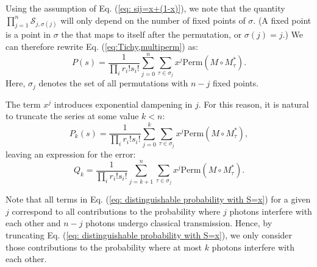 \documentclass[10pt,aps,pra,twocolumn,superscriptaddress]{revtex4-2}
\begin{document}
Using the assumption of Eq. (\ref{eq: sij=x+(1-x)}), we note that
the quantity $\prod^n_{j=1} \mathcal{S}_{j,\sigma(j)}$ will only depend on the number of fixed points of $\sigma$. (A fixed point is a point in $\sigma$ the that maps to itself after the permutation, or $\sigma(j)=j$.) We can therefore rewrite Eq. (\ref{eq:Tichy,multiperm}) as: 
\begin{equation}
    P(s)=\frac{1}{\prod_i r_i! s_i!}\sum_{j=0}^n\sum_{\tau \in \sigma_j}x^j \text{Perm}(M \circ M^*_{\tau}).
    \label{eq: distinguishable probability with S=x}
\end{equation}
Here, $\sigma_j$ denotes the set of all permutations with $n-j$ fixed points. 

The term $x^j$ introduces exponential dampening in $j$. For this reason, it is natural to truncate the series at some value $k<n$:
\begin{equation}
    P_k(s)=\frac{1}{\prod_i r_i! s_i!}\sum_{j=0}^k\sum_{\tau \in \sigma_j}x^j \text{Perm}(M \circ M^*_{\tau}),
    \label{eq: truncated distinguishable probability with S=x}
\end{equation}
leaving an expression for the error:
\begin{equation}
    Q_k=\frac{1}{\prod_i r_i! s_i!}\sum_{j=k+1}^n\sum_{\tau \in \sigma_j}x^j \text{Perm}(M \circ M^*_{\tau}).
    \label{eq: error truncation distinguishable probability with S=x}
\end{equation}

Note that all terms in Eq. (\ref{eq: distinguishable probability with S=x}) for a given $j$ correspond to all contributions to the probability where $j$ photons interfere with each other and $n-j$ photons undergo classical transmission. Hence, by truncating Eq. (\ref{eq: distinguishable probability with S=x}), we only consider those contributions to the probability where at most $k$ photons interfere with each other.
\end{document}
